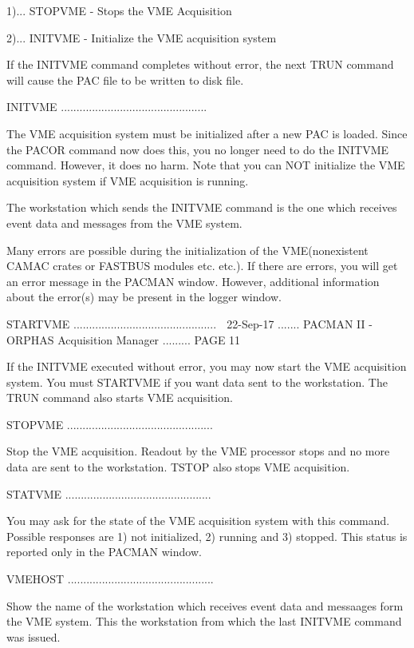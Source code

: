           1)... STOPVME - Stops the VME Acquisition
 
          2)... INITVME - Initialize the VME acquisition system
 
   If the INITVME command completes without error, the next TRUN command  will
   cause the PAC file to be written to disk file.
 
   INITVME ...............................................
 
   The  VME  acquisition system must be initialized after a new PAC is loaded.
   Since the PACOR command now does  this,  you  no  longer  need  to  do  the
   INITVME  command.   However,  it  does  no  harm.  Note  that  you  can NOT
   initialize the VME acquisition system if VME acquisition is running.
 
   The workstation which sends the INITVME command is the one  which  receives
   event data and messages from the VME system.
 
   Many  errors  are possible during the initialization of the VME(nonexistent
   CAMAC crates or FASTBUS modules etc. etc.). If there are errors,  you  will
   get  an error message in the PACMAN window. However, additional information
   about the error(s) may be present in the logger window.
 
   STARTVME ..............................................
    
   22-Sep-17 ....... PACMAN II - ORPHAS Acquisition Manager ......... PAGE  11
 
 
   If  the  INITVME  executed  without  error,  you  may  now  start  the  VME
   acquisition  system.  You  must  STARTVME  if  you  want  data  sent to the
   workstation.  The TRUN command also starts VME acquisition.
 
   STOPVME ...............................................
 
   Stop the VME acquisition. Readout by the VME processor stops  and  no  more
   data are sent to the workstation.  TSTOP also stops VME acquisition.
 
   STATVME ...............................................
 
   You  may ask for the state of the VME acquisition system with this command.
   Possible responses are 1) not initialized, 2) running and 3) stopped.  This
   status is reported only in the PACMAN window.
 
   VMEHOST ...............................................
 
   Show  the  name  of the workstation which receives event data and messaages
   form the VME system.  This the  workstation  from  which  the  last INITVME
   command was issued.
 
